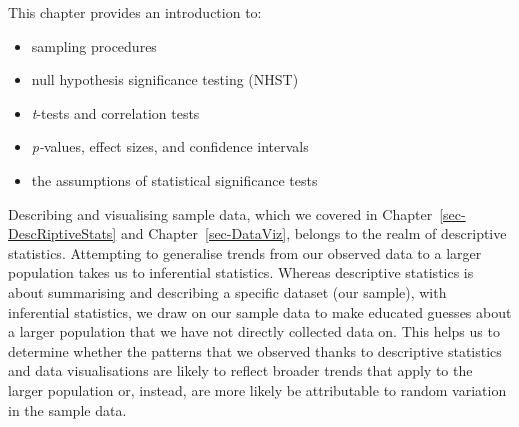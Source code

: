 \documentclass[
  letterpaper,
  DIV=11,
  numbers=noendperiod]{scrreprt}
\providecommand{\tightlist}{%
  \setlength{\itemsep}{0pt}\setlength{\parskip}{0pt}}
\begin{document}
This chapter provides an introduction to:

\begin{itemize}
\tightlist
\item
  sampling procedures
\item
  null hypothesis significance testing (NHST)
\item
  \emph{t}-tests and correlation tests
\item
  \emph{p-}values, effect sizes, and confidence intervals
\item
  the assumptions of statistical significance tests
\end{itemize}

Describing and visualising sample data, which we covered in
Chapter~\ref{sec-DescRiptiveStats} and Chapter~\ref{sec-DataViz},
belongs to the realm of descriptive statistics. Attempting to generalise
trends from our observed data to a larger population takes us to
inferential statistics. Whereas descriptive statistics is about
summarising and describing a specific dataset (our sample), with
inferential statistics, we draw on our sample data to make educated
guesses about a larger population that we have not directly collected
data on. This helps us to determine whether the patterns that we
observed thanks to descriptive statistics and data visualisations are
likely to reflect broader trends that apply to the larger population or,
instead, are more likely be attributable to random variation in the
sample data.
\end{document}
